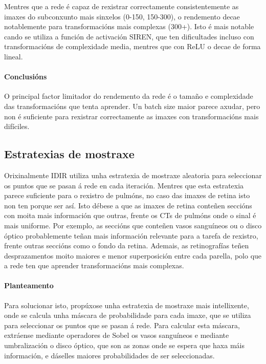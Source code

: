 Mentres que a rede é capaz de rexistrar correctamente consistentemente as imaxes do subconxunto mais sinxelos (0-150, 150-300), o rendemento decae notablemente para transformacións mais complexas (300+). 
Isto é mais notable cando se utiliza a función de activación SIREN, que ten dificultades incluso con transformacións de complexidade media, mentres que con ReLU o decae de forma lineal.

\paragraph{Conclusións}
\label{par:Conclusions-batchsize}

O principal factor limitador do rendemento da rede é o tamaño e complexidade das transformacións que tenta aprender.
Un batch size maior parece axudar, pero non é suficiente para rexistrar correctamente as imaxes con transformacións mais difíciles.

\subsection{Estratexias de mostraxe}
\label{subsec:Estratexias de mostraxe}

Orixinalmente IDIR utiliza unha estratexia de mostraxe aleatoria para seleccionar os puntos que se pasan á rede en cada iteración.
Mentres que esta estratexia parece suficiente para o rexistro de pulmóns, no caso das imaxes de retina isto non ten porque ser así.
Isto débese a que as imaxes de retina conteñen seccións con moita mais información que outras, frente os CTs de pulmóns onde o sinal é mais uniforme.
Por exemplo, as seccións que conteñen vasos sanguíneos ou o disco óptico probablemente teñan mais información relevante para a tarefa de rexistro, frente outras seccións como o fondo da retina.
Ademais, as retinografías teñen desprazamentos moito maiores e menor superposición entre cada parella, polo que a rede ten que aprender transformacións mais complexas.

\paragraph{Planteamento}
\label{par:Planteamento-sampling}

Para solucionar isto, propúxose unha estratexia de mostraxe mais intellixente, onde se calcula unha máscara de probabilidade para cada imaxe, que se utiliza para seleccionar os puntos que se pasan á rede.
Para calcular esta máscara, extráense mediante operadores de Sobel os vasos sanguíneos e mediante umbralización o disco óptico, que son as zonas onde se espera que haxa máis información, e dáselles maiores probabilidades de ser seleccionadas.

